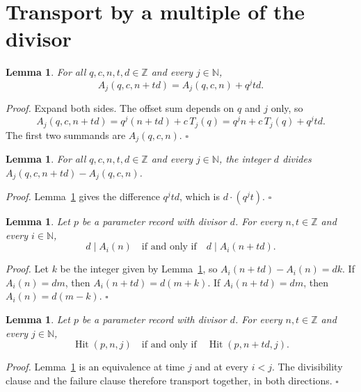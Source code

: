 \documentclass[11pt,letterpaper]{article}
\newcommand{\N}{\mathbb{N}}
\newcommand{\Z}{\mathbb{Z}}
\newtheorem{lemma}[theorem]{Lemma}
\newenvironment{proof}{\noindent\textit{Proof.}}{\hfill\(\square\)}
\begin{document}
\section{Transport by a multiple of the divisor}

\begin{lemma}
\label{lem:shift}
For all \(q,c,n,t,d\in\Z\) and every \(j\in\N\),
\[
A_j(q,c,n+td)=A_j(q,c,n)+q^j td.
\]
\end{lemma}

\begin{proof}
Expand both sides. The offset sum depends on \(q\) and \(j\) only, so
\[
A_j(q,c,n+td)=q^j(n+td)+c\,T_j(q)
=q^j n+c\,T_j(q)+q^j td.
\]
The first two summands are \(A_j(q,c,n)\).
\end{proof}

\begin{lemma}
\label{lem:difference}
For all \(q,c,n,t,d\in\Z\) and every \(j\in\N\), the integer \(d\) divides
\(A_j(q,c,n+td)-A_j(q,c,n)\).
\end{lemma}

\begin{proof}
Lemma~\ref{lem:shift} gives the difference \(q^j td\), which is
\(d\cdot(q^j t)\).
\end{proof}

\begin{lemma}
\label{lem:div-shift}
Let \(p\) be a parameter record with divisor \(d\). For every \(n,t\in\Z\) and
every \(i\in\N\),
\[
d\mid A_i(n)\quad\text{if and only if}\quad d\mid A_i(n+td).
\]
\end{lemma}

\begin{proof}
Let \(k\) be the integer given by Lemma~\ref{lem:difference}, so
\(A_i(n+td)-A_i(n)=dk\). If \(A_i(n)=dm\), then
\(A_i(n+td)=d(m+k)\). If \(A_i(n+td)=dm\), then
\(A_i(n)=d(m-k)\).
\end{proof}

\begin{lemma}
\label{lem:hit-shift}
Let \(p\) be a parameter record with divisor \(d\). For every \(n,t\in\Z\) and
every \(j\in\N\),
\[
\operatorname{Hit}(p,n,j)\quad\text{if and only if}\quad
\operatorname{Hit}(p,n+td,j).
\]
\end{lemma}

\begin{proof}
Lemma~\ref{lem:div-shift} is an equivalence at time \(j\) and at every
\(i<j\). The divisibility clause and the failure clause therefore transport
together, in both directions.
\end{proof}
\end{document}
